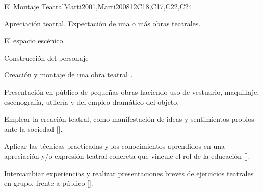 \begin{syllabus}
\begin{unit}{}{El  Montaje Teatral}{Marti2001,Marti2008}{12}{C18,C17,C22,C24}
\begin{topics}
	\item Apreciación teatral. Expectación de una o más obras teatrales.
	\item El espacio escénico.
	\item Construcción del personaje
	\item Creación y montaje de una obra teatral .
	\item Presentación en público de pequeñas obras haciendo uso de vestuario, maquillaje, escenografía, utilería y del empleo dramático del objeto.
\end{topics}
\begin{learningoutcomes}
	\item Emplear  la creación teatral, como manifestación de ideas y sentimientos propios ante la sociedad [\Usage].
	\item Aplicar las técnicas practicadas y los conocimientos aprendidos en una apreciación y/o expresión teatral concreta que vincule el rol de la educación [\Usage].
	\item Intercambiar experiencias y realizar presentaciones breves de ejercicios teatrales en grupo, frente a público [\Usage].
\end{learningoutcomes}
\end{unit}



\begin{coursebibliography}
\end{coursebibliography}

\end{syllabus}
